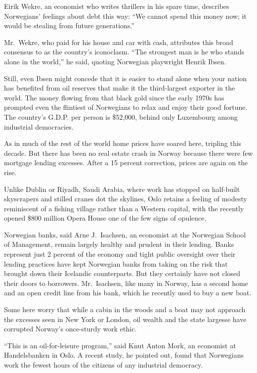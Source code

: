 \documentclass[12pt,a4paper,onecolumn]{article}
\begin{document}
Eirik Wekre, an economist who writes thrillers in his spare time, describes Norwegians' feelings
about debt this way: ``We cannot spend this money now; it would be stealing from future
generations.''

Mr.~Wekre, who paid for his house and car with cash, attributes this broad consensus to as the
country's iconoclasm. ``The strongest man is he who stands alone in the world,'' he said, quoting
Norwegian playwright Henrik Ibsen.

Still, even Ibsen might concede that it is easier to stand alone when your nation has benefited from
oil reserves that make it the third-largest exporter in the world. The money flowing from that black
gold since the early 1970s has prompted even the flintiest of Norwegians to relax and enjoy their
good fortune. The country's G.D.P. per person is \$52,000, behind only Luxembourg among industrial
democracies.

As in much of the rest of the world home prices have soared here, tripling this decade. But there
has been no real estate crash in Norway because there were few mortgage lending excesses. After a 15
percent correction, prices are again on the rise.

Unlike Dublin or Riyadh, Saudi Arabia, where work has stopped on half-built skyscrapers and stilled
cranes dot the skylines, Oslo retains a feeling of modesty reminiscent of a fishing village rather
than a Western capital, with the recently opened \$800 million Opera House one of the few signs of
opulence.

Norwegian banks, said Arne J.~Isachsen, an economist at the Norwegian School of Management, remain
largely healthy and prudent in their lending. Banks represent just 2 percent of the economy and
tight public oversight over their lending practices have kept Norwegian banks from taking on the
risk that brought down their Icelandic counterparts. But they certainly have not closed their doors
to borrowers. Mr.~Isachsen, like many in Norway, has a second home and an open credit line from his
bank, which he recently used to buy a new boat.

Some here worry that while a cabin in the woods and a boat may not approach the excesses seen in New
York or London, oil wealth and the state largesse have corrupted Norway's once-sturdy work ethic.

``This is an oil-for-leisure program,'' said Knut Anton Mork, an economist at Handelsbanken in Oslo.
A recent study, he pointed out, found that Norwegians work the fewest hours of the citizens of any
industrial democracy.
\end{document}
